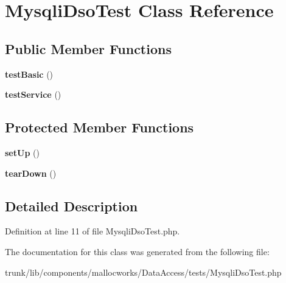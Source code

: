 \hypertarget{class_mysqli_dso_test}{
\section{MysqliDsoTest Class Reference}
\label{class_mysqli_dso_test}
}
\subsection*{Public Member Functions}
\begin{DoxyCompactItemize}
\item 
\hypertarget{class_mysqli_dso_test_a43130cb481135ee931f1562a1503378a}{
{\bfseries testBasic} ()}
\label{class_mysqli_dso_test_a43130cb481135ee931f1562a1503378a}

\item 
\hypertarget{class_mysqli_dso_test_a89f1a3406961a29cfd7c274b062d92eb}{
{\bfseries testService} ()}
\label{class_mysqli_dso_test_a89f1a3406961a29cfd7c274b062d92eb}

\end{DoxyCompactItemize}
\subsection*{Protected Member Functions}
\begin{DoxyCompactItemize}
\item 
\hypertarget{class_mysqli_dso_test_a0bc688732d2b3b162ffebaf7812e78da}{
{\bfseries setUp} ()}
\label{class_mysqli_dso_test_a0bc688732d2b3b162ffebaf7812e78da}

\item 
\hypertarget{class_mysqli_dso_test_a80fe3d17e658907fc75346a0ec9d6fc7}{
{\bfseries tearDown} ()}
\label{class_mysqli_dso_test_a80fe3d17e658907fc75346a0ec9d6fc7}

\end{DoxyCompactItemize}


\subsection{Detailed Description}


Definition at line 11 of file MysqliDsoTest.php.



The documentation for this class was generated from the following file:\begin{DoxyCompactItemize}
\item 
trunk/lib/components/mallocworks/DataAccess/tests/MysqliDsoTest.php\end{DoxyCompactItemize}
